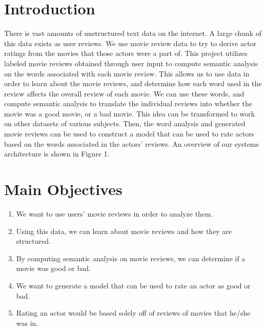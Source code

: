 \documentclass[a0,portrait]{a0poster}
\begin{document}
\begin{multicols}{2} %


\color{SaddleBrown} %

\section*{Introduction}

There is vast amounts of unstructured text data on the internet.  A large chunk of this data exists as user reviews. We use movie review data to try to derive actor ratings from the movies that those actors were a part of.  This project utilizes labeled movie reviews obtained through user input to compute semantic analysis on the words associated with each movie review.  This allows us to use data in order to learn about the movie reviews, and determine how each word used in the review affects the overall review of each movie.  We can use these words, and compute semantic analysis to translate the individual reviews into whether the movie was a good movie, or a bad movie.  This idea can be transformed to work on other datasets of various subjects.  Then, the word analysis and generated movie reviews can be used to construct a model that can be used to rate actors based on the words associated in the actors’ reviews. An overview of our systems architecture is shown in Figure 1. 



\color{DarkSlateGray} %

\section*{Main Objectives}

\begin{enumerate}
\item We want to use users’ movie reviews in order to analyze them.
\item Using this data, we can learn about movie reviews and how they are structured.
\item By computing semantic analysis on movie reviews, we can determine if a movie was good or bad.
\item We want to generate a model that can be used to rate an actor as good or bad.
\item Rating an actor would be based solely off of reviews of movies that he/she was in.
\end{enumerate}


\end{multicols}
\end{document}
